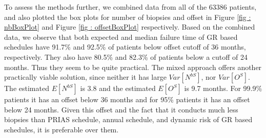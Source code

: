 To assess the methods further, we combined data from all of the 63386 patients, and also plotted the box plots for number of biopsies and offset in Figure \ref{fig : nbBoxPlot} and Figure \ref{fig : offsetBoxPlot} respectively. Based on the combined data, we observe that both expected and median failure time of GR based schedules have 91.7\% and 92.5\% of patients below offset cutoff of 36 months, respectively. They also have 80.5\% and 82.3\% of patients below a cutoff of 24 months. Thus they seem to be quite practical. The mixed approach offers another practically viable solution, since neither it has large $Var[N^{bS}]$, nor $Var[O^S]$. The estimated $E[N^{bS}]$ is 3.8 and the estimated $E[O^S]$ is 9.7 months. For 99.9\% patients it has an offset below 36 months and for 95\% patients it has an offset below 24 months. Given this offset and the fact that it conducts much less biopsies than PRIAS schedule, annual schedule, and dynamic risk of GR based schedules, it is preferable over them.

